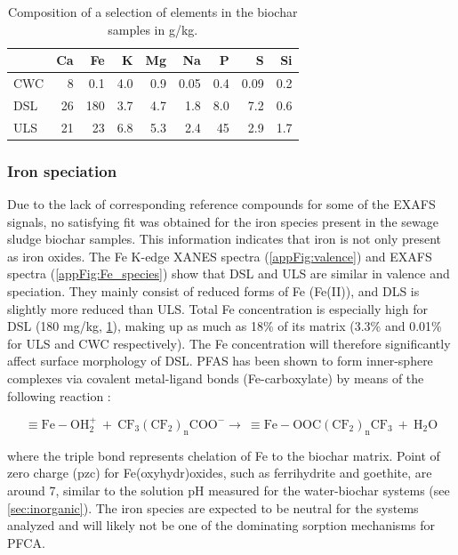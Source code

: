 \begin{table}
\centering
\caption{Composition of a selection of elements in the biochar samples in g/kg.}
\label{tab:BC_mainElements}
\begin{tabular}{lrrrrrrrr} \toprule
 & Ca & Fe & K & Mg & Na & P & S & Si \\ \midrule
CWC & 8 & 0.1 & 4.0 & 0.9 & 0.05 & 0.4 & 0.09 & 0.2 \\
DSL & 26 & 180 & 3.7 & 4.7 & 1.8 & 8.0 & 7.2 & 0.6 \\
ULS & 21 & 23 & 6.8 & 5.3 & 2.4 & 45 & 2.9 & 1.7 \\ \bottomrule
\end{tabular}
\end{table}

\subsubsection{Iron speciation\label{sec:Fe}}
Due to the lack of corresponding reference compounds for some of the EXAFS signals, no satisfying fit was obtained for the iron species present in the sewage sludge biochar samples. This information indicates that iron is not only present as iron oxides. The Fe K-edge XANES spectra (\cref{appFig:valence}) and EXAFS spectra (\cref{appFig:Fe_species}) show that DSL and ULS are similar in valence and speciation. They mainly consist of reduced forms of Fe (Fe(II)), and DLS is slightly more reduced than ULS. Total Fe concentration is especially high for DSL (180 mg/kg, \cref{tab:BC_mainElements}), making up as much as 18\% of its matrix (3.3\% and 0.01\% for ULS and CWC respectively). The Fe concentration will therefore significantly affect surface morphology of DSL. PFAS has been shown to form inner-sphere complexes via covalent metal-ligand bonds (Fe-carboxylate) by means of the following reaction \citep{du2014adsorption}:

\begin{equation}
    \mathrm{\equiv Fe-OH_2^+ ~ + ~ CF_3(CF_2)_nCOO^- \rightarrow ~ \equiv Fe-OOC(CF_2)_nCF_3 ~+~ H_2O}
\end{equation}

where the triple bond represents chelation of Fe to the biochar matrix. Point of zero charge (pzc) for Fe(oxyhydr)oxides, such as ferrihydrite and goethite, are around 7, similar to the solution pH measured for the water-biochar systems (see \cref{sec:inorganic}). The iron species are expected to be neutral for the systems analyzed and will likely not be one of the dominating sorption mechanisms for PFCA. 

